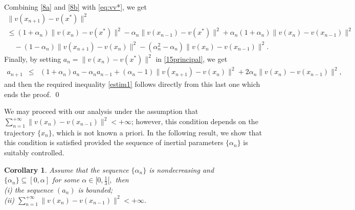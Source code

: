 \documentclass[11pt]{article}
\makeatletter
\renewenvironment{proof}[1][\proofname]{\par
	\normalfont
	\topsep0\p@\@plus3\p@ \trivlist
	\item[\hskip\labelsep\itshape
	#1\@addpunct{.}]\ignorespaces
}{%
	\qed\endtrivlist
}
\newtheorem{corollary}[theorem]{Corollary}
\theoremstyle{definition}
\theoremstyle{definition}
\theoremstyle{definition}
\makeatother
\begin{document}
\begin{proof}
\begin{equation}
\begin{array}{lll}
\end{array} 
\end{equation}
Combining \eqref{8a} and \eqref{8b} with \eqref{eq:vv*}, we get 
\begin{equation}\label{15principal}
\begin{array}{l}
\|v(x_{n+1})-v(x^*)\|^{2}\\
\leq(1+\alpha_n)\|v(x_{n})-v(x^*)\|^{2}-\alpha_n\|v(x_{n-1})-v(x^*)\|^{2}+\alpha_n(1+\alpha_n)\|v(x_n)-v(x_{n-1})\|^{2}\\
\quad-(1-\alpha_n)\|v(x_{n+1})-v(x_{n})\|^2-(\alpha_n^2-\alpha_n)\|v(x_{n})-v(x_{n-1})\|^{2}.
\end{array}
\end{equation}
Finally, by setting $a_n=\|v(x_n)-v(x^*)\|^{2}$ in \eqref{15principal}, we get
\begin{equation*}%
\begin{array}{rcl}
a_{n+1}&\leq &(1+\alpha_n)a_n-\alpha_n a_{n-1} +(\alpha_n-1)\|v(x_{n+1})-v(x_{n})\|^2+2\alpha_n\|v(x_n)-v(x_{n-1})\|^2,
\end{array}
\end{equation*}
and then the required inequality \eqref{estim1} follows directly from this last one which ends the proof.
\end{proof}

We may proceed with our analysis under the assumption that $\displaystyle \sum_{n=1}^{+\infty}\|v(x_n)-v(x_{n-1})\|^2<+\infty$; however, this condition depends on the trajectory $\{x_n\}$, which is not known a priori. In the following result, we show that this condition is satisfied provided the sequence of inertial parameters $\lbrace \alpha_n \rbrace$ is suitably controlled.
\begin{corollary}\label{coro-disc}
	 Assume that the sequence $\{\alpha_n\}$ is nondecreasing and $\{\alpha_n\} \subseteq [0,\alpha]$ for some $\alpha\in [0,\frac{1}{3}[,$ then  \\
	 
	{ (i) the sequence $(a_n)$ is bounded};\\
	 
	 (ii) $\displaystyle \sum_{n=1}^{+\infty}\|v(x_n)-v(x_{n-1})\|^2<+\infty.$
\end{corollary}
\end{document}
